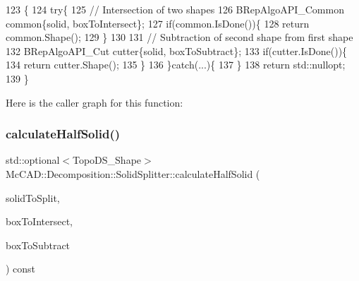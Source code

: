 \begin{DoxyCode}
123                                                 \{
124     \textcolor{keywordflow}{try}\{
125         \textcolor{comment}{// Intersection of two shapes}
126         BRepAlgoAPI\_Common common\{solid, boxToIntersect\};
127         \textcolor{keywordflow}{if}(common.IsDone())\{
128             \textcolor{keywordflow}{return} common.Shape();
129         \}
130 
131         \textcolor{comment}{// Subtraction of second shape from first shape}
132         BRepAlgoAPI\_Cut cutter\{solid, boxToSubtract\};
133         \textcolor{keywordflow}{if}(cutter.IsDone())\{
134             \textcolor{keywordflow}{return} cutter.Shape();
135         \}
136     \}\textcolor{keywordflow}{catch}(...)\{
137     \}
138     \textcolor{keywordflow}{return} std::nullopt;
139 \}
\end{DoxyCode}
Here is the caller graph for this function\+:
\mbox{\label{classMcCAD_1_1Decomposition_1_1SolidSplitter_a75c73265fa39797edb0d2b298192d193}} 
\subsubsection{\texorpdfstring{calculate\+Half\+Solid()}{calculateHalfSolid()}\hspace{0.1cm}{\footnotesize\ttfamily [2/2]}}
{\footnotesize\ttfamily std\+::optional$<$Topo\+D\+S\+\_\+\+Shape$>$ Mc\+C\+A\+D\+::\+Decomposition\+::\+Solid\+Splitter\+::calculate\+Half\+Solid (\begin{DoxyParamCaption}\item[{const Topo\+D\+S\+\_\+\+Solid \&}]{solid\+To\+Split,  }\item[{const Topo\+D\+S\+\_\+\+Shape \&}]{box\+To\+Intersect,  }\item[{const Topo\+D\+S\+\_\+\+Shape \&}]{box\+To\+Subtract }\end{DoxyParamCaption}) const\hspace{0.3cm}{\ttfamily [private]}}

\mbox{\label{classMcCAD_1_1Decomposition_1_1SolidSplitter_a96441384cc19440a4884adca0bc26be3}} 
